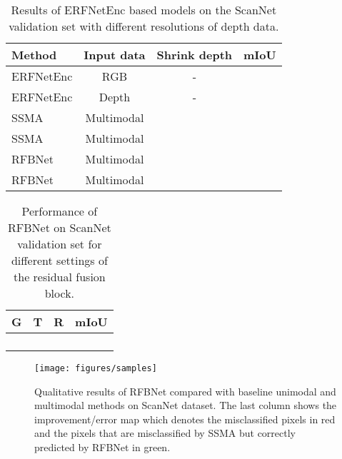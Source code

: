 \documentclass[letterpaper, 10 pt, conference]{ieeeconf}
\begin{document}
	\begin{table}[t]
		\footnotesize 
		\centering
		\caption{Results of ERFNetEnc based models on the ScanNet validation set with different resolutions of depth data.}
		\label{tab_scannet_erfnetenc_val_depth}
		\begin{threeparttable}
			\begin{tabular}{l c c c}
				\toprule
				Method & Input data & Shrink depth & mIoU \\
				\midrule
				ERFNetEnc 		& RGB 		& - & 	\\
				ERFNetEnc 		& Depth 	& - & 	\\
				SSMA 	& Multimodal		&  & 	\\
				SSMA 	& Multimodal 	&  &  	\\
				RFBNet 	& Multimodal&  &  	\\
				RFBNet 	& Multimodal&  &   \\
				\bottomrule
			\end{tabular}
		\end{threeparttable}
	\end{table}
	\begin{table}[!t]
		\footnotesize
		\caption{Performance of RFBNet on ScanNet validation set for different settings of the residual fusion block.}
		\label{tab_scannet_erfnetenc_val_rfb}
		\centering
\begin{threeparttable}
			\begin{tabular}{c c c c}
				\toprule
				G & T & R & mIoU \\
				\midrule
				&			 &			& 	\\
				&  			 &			& 	\\
				&&			& 	\\
				&			 && 	\\
				\bottomrule
			\end{tabular}
\end{threeparttable}
	\end{table}
	
	
	\begin{figure*}[!htbp]
		\centering
		\texttt{[image: figures/samples]}
		\caption{Qualitative results of RFBNet compared with baseline unimodal and multimodal methods on ScanNet dataset. The last column shows the improvement/error map which denotes the misclassified pixels in red and the pixels that are misclassified by SSMA but correctly predicted by RFBNet in green.}
		\label{fig_samples}
	\end{figure*}
	
\end{document}
